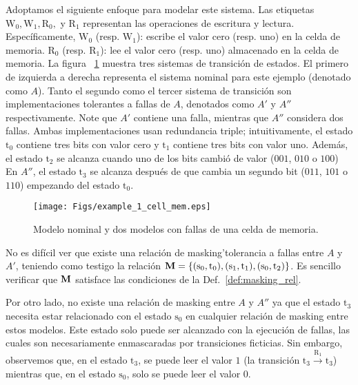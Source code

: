 \begin{example}
Adoptamos el siguiente enfoque para modelar este sistema. Las etiquetas $\text{W}_0, \text{W}_1, \text{R}_0,$ y $\text{R}_1$
representan las operaciones de escritura y lectura. Específicamente, $\text{W}_0$ (resp. $\text{W}_1$): escribe el valor cero (resp. uno) en la celda de memoria. $\text{R}_0$ (resp. $\text{R}_1$): lee el valor cero (resp. uno) almacenado en la celda de memoria.
La figura ~\ref{figure:exam_1_mem_cell} muestra tres sistemas de transición de estados. El primero de izquierda a derecha representa el sistema nominal para este ejemplo (denotado como $A$).
Tanto el segundo como el tercer sistema de transición son implementaciones tolerantes a fallas de $A$, denotados como $A'$ y $A''$ respectivamente. Note que $A'$ contiene una falla, mientras que $A''$ considera dos fallas. Ambas implementaciones usan redundancia triple; intuitivamente, el estado $\text{t}_0$ contiene tres bits con valor cero y $\text{t}_1$ contiene tres bits con valor uno.
Además, el estado $\text{t}_2$ se alcanza cuando uno de los bits cambió de valor ($001$, $010$ o $100$)
En  $A''$, el estado $\text{t}_3$ se alcanza después de que cambia un segundo bit ($011$, $101$ o $110$) empezando del estado $\text{t}_0$.
\begin{figure}[h] 
\begin{center}
    \texttt{[image: Figs/example\_1\_cell\_mem.eps]} 
    \caption{Modelo nominal y dos modelos con fallas de una celda de memoria.}
    \label{figure:exam_1_mem_cell}
\end{center}
\end{figure}
\sloppy No es difícil ver que existe una relación de masking'tolerancia a fallas entre $A$ y $A'$, teniendo como testigo la relación $\mathbin{\mathbf{M}} = \{(\text{s}_0, \text{t}_0), (\text{s}_1, \text{t}_1), (\text{s}_0, \text{t}_2)\}$. Es sencillo verificar que $\mathbin{\mathbf{M}}$ satisface las condiciones de la Def.~\ref{def:masking_rel}.

Por otro lado, no existe una relación de masking entre $A$ y $A''$ ya que el estado $\text{t}_3$ necesita estar relacionado con el estado $\text{s}_0$ en cualquier relación de masking entre estos modelos. Este estado solo puede ser alcanzado con la ejecución de fallas, las cuales son necesariamente enmascaradas por transiciones ficticias. Sin embargo, observemos que, en el estado $\text{t}_3$, se puede leer el valor $1$ (la transición $\text{t}_3 \xrightarrow{\text{R}_1} \text{t}_3$) mientras que, en el estado $\text{s}_0$, solo se puede leer el valor $0$.
\end{example}
 
